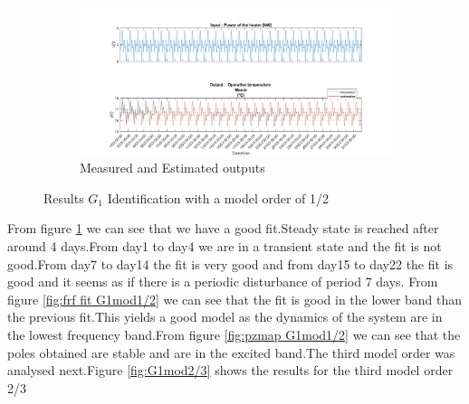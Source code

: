 \documentclass[a4paper,12pt]{report}
\numberwithin{equation}{section}
\begin{document}
\begin{figure}[H]\ContinuedFloat
 \begin{subfigure}{\textwidth}
  \centering
  \includegraphics[scale=0.3]{G1mod12InOut.png}
  \caption{Measured and Estimated outputs}
  \label{fig:inoutG11/2}
\end{subfigure}
\caption{Results $G_{1}$ Identification with a model order of 1/2 }
\label{fig:G1mod1/2}
\end{figure}

\noindent
From figure \ref{fig:inoutG11/2} we can see that we have a good fit.Steady state is reached after around 4 days.From day1 to day4 we are in a transient state and the fit is not good.From day7 to day14 the fit is very good and from day15 to day22 the fit is good and it seems as if there is a periodic disturbance of period 7 days. From figure \ref{fig:frf fit G1mod1/2} we can see that the fit is good in the lower band than the previous fit.This yields a good model as the dynamics of the system are in the lowest frequency band.From figure \ref{fig:pzmap G1mod1/2} we can see that the poles obtained are stable and are in the excited band.The third model order was analysed next.Figure \ref{fig:G1mod2/3} shows the results for the third model order 2/3 
\end{document}
